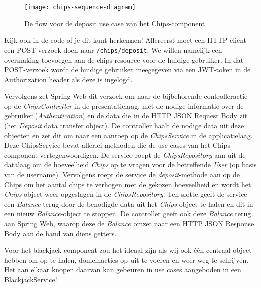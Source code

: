 \documentclass[dutch,a4paper,12pt,doubleside]{book}
\begin{document}
\begin{figure}[H]
    \centering
    \texttt{[image: chips-sequence-diagram]}
    \caption{De flow voor de deposit use case van het Chips-component}
    \label{fig:chips-sequence-diagram}
\end{figure}

Kijk ook in de code of je dit kunt herkennen!
Allereerst moet een HTTP-client een POST-verzoek doen naar 
\texttt{/chips/deposit}. We willen namelijk een overmaking toevoegen
aan de chips resource voor de huidige gebruiker. In dat POST-verzoek 
wordt de huidige gebruiker meegegeven via een JWT-token in de Authorization header
als deze is ingelogd. 

Vervolgens zet Spring Web dit verzoek om naar de bijbehorende 
controlleractie op de \emph{ChipsController} in de presentatielaag, met de
nodige informatie over de gebruiker (\emph{Authentication}) en de data die 
in de HTTP JSON Request Body zit (het \emph{Deposit} data transfer object).
De controller haalt de nodige data uit deze objecten en zet dit om naar 
een aanroep op de \emph{ChipsService} in de applicatielaag. 
Deze ChipsService bevat allerlei methoden die de use cases van 
het Chips-component vertegenwoordigen.
De service roept de \emph{ChipsRepository} aan uit de datalaag om de hoeveelheid
\emph{Chips} op te vragen voor de betreffende \emph{User} (op basis van de username). 
Vervolgens roept de service de \emph{deposit}-methode aan op de Chips om het aantal chips te verhogen met de 
gekozen hoeveelheid en wordt het \emph{Chips} object weer opgeslagen in de \emph{ChipsRepository}.
Ten slotte geeft de service een \emph{Balance} terug door de benodigde data uit het 
\emph{Chips}-object te halen en dit in een nieuw \emph{Balance}-object te stoppen.
De controller geeft ook deze \emph{Balance} terug aan Spring Web, waarop deze de 
\emph{Balance} omzet naar een HTTP JSON Response Body aan de hand van diens getters.

Voor het blackjack-component zou het ideaal zijn als wij ook één centraal object hebben 
om op te halen, domeinacties op uit te voeren en weer weg te schrijven. Het aan elkaar 
knopen daarvan kan gebeuren in use cases aangeboden in een BlackjackService!
\end{document}
